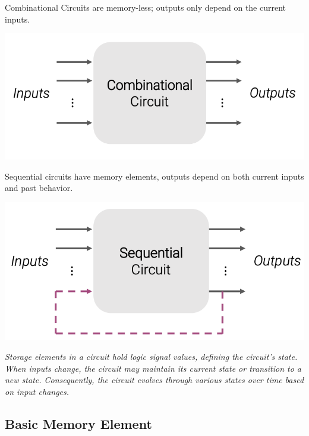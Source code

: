 \documentclass[12pt,openany]{book}
\begin{document}
\vspace*{10px}
\begin{minipage}{0.45\textwidth}
    Combinational Circuits are memory-less; outputs only depend on the current inputs.
    \begin{center}
        \includegraphics[width=\linewidth]{circuits/12.1.2.png}
    \end{center}
\end{minipage}
\hfill
\vline
\hfill
\begin{minipage}{0.45\textwidth}
	Sequential circuits have memory elements, outputs depend on both current inputs and past behavior.  
	\begin{center}
		\includegraphics[width=\linewidth]{circuits/12.1.2_2.png}
	\end{center}
\end{minipage}

\vspace*{10px}
\textit{
	Storage elements in a circuit hold logic signal values, defining the circuit's state. When inputs change, the circuit may maintain its current state or transition to a new state. Consequently, the circuit evolves through various states over time based on input changes.}


\subsection{Basic Memory Element}
\end{document}
